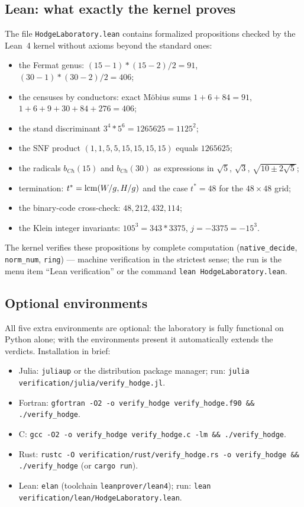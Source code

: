 \subsection{Lean: what exactly the kernel proves}

The file \texttt{HodgeLaboratory.lean} contains formalized
propositions checked by the Lean~4 kernel without axioms beyond the
standard ones:
\begin{itemize}[leftmargin=1.6em, itemsep=0.1em]
\item the Fermat genus: $(15-1)*(15-2)/2=91$,
  $(30-1)*(30-2)/2=406$;
\item the censuses by conductors: exact M\"obius sums
  $1+6+84=91$, $1+6+9+30+84+276=406$;
\item the stand discriminant $3^4*5^6=1265625=1125^2$;
\item the SNF product $(1,1,5,5,15,15,15,15)$ equals $1265625$;
\item the radicals $b_{Ch}(15)$ and $b_{Ch}(30)$ as expressions in
  $\sqrt5$, $\sqrt3$, $\sqrt{10\pm2\sqrt5}$;
\item termination: $t^*=\operatorname{lcm}(W/g, H/g)$ and the case $t^*=48$ for
  the $48\times48$ grid;
\item the binary-code cross-check: $48,212,432,114$;
\item the Klein integer invariants: $105^3=343*3375$,
  $j=-3375=-15^3$.
\end{itemize}
The kernel verifies these propositions by complete computation
(\texttt{native\_decide}, \texttt{norm\_num}, \texttt{ring}) ---
machine verification in the strictest sense; the run is the menu
item ``Lean verification'' or the command
\texttt{lean HodgeLaboratory.lean}.

\subsection{Optional environments}

All five extra environments are optional: the laboratory is fully
functional on Python alone; with the environments present it
automatically extends the verdicts. Installation in brief:

\begin{itemize}[leftmargin=1.6em, itemsep=0.1em]
\item Julia: \texttt{juliaup} or the distribution package manager;
  run: \texttt{julia verification/julia/verify\_hodge.jl}.
\item Fortran: \texttt{gfortran -O2 -o verify\_hodge
  verify\_hodge.f90 \&\& ./verify\_hodge}.
\item C: \texttt{gcc -O2 -o verify\_hodge verify\_hodge.c -lm
  \&\& ./verify\_hodge}.
\item Rust: \texttt{rustc -O verification/rust/verify\_hodge.rs -o
  verify\_hodge \&\& ./verify\_hodge} (or \texttt{cargo run}).
\item Lean: \texttt{elan} (toolchain \texttt{leanprover/lean4});
  run: \texttt{lean verification/lean/HodgeLaboratory.lean}.
\end{itemize}

